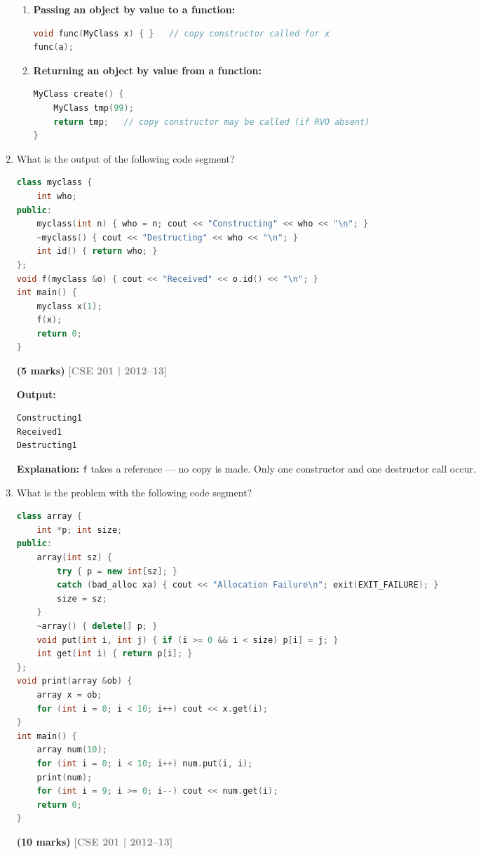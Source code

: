 \documentclass[12pt,a3paper]{article}
\newcommand{\yr}[1]{\hfill\textcolor{gray}{\small\textbf{[#1]}}}
\newcommand{\mk}[1]{\textcolor{orange!70!black}{\small\textbf{(#1 marks)}}}
\begin{document}
\begin{enumerate}
\begin{tcolorbox}
\begin{enumerate}[label=\textbf{\arabic*.}]
  \item \textbf{Passing an object by value to a function:}
\begin{lstlisting}[language=C++]
void func(MyClass x) { }   // copy constructor called for x
func(a);
\end{lstlisting}

  \item \textbf{Returning an object by value from a function:}
\begin{lstlisting}[language=C++]
MyClass create() {
    MyClass tmp(99);
    return tmp;   // copy constructor may be called (if RVO absent)
}
\end{lstlisting}
\end{enumerate}

\end{tcolorbox}


\item What is the output of the following code segment?
\begin{lstlisting}[language=C++]
class myclass {
    int who;
public:
    myclass(int n) { who = n; cout << "Constructing" << who << "\n"; }
    ~myclass() { cout << "Destructing" << who << "\n"; }
    int id() { return who; }
};
void f(myclass &o) { cout << "Received" << o.id() << "\n"; }
int main() {
    myclass x(1);
    f(x);
    return 0;
}
\end{lstlisting}
\mk{5}
\yr{CSE 201 | 2012--13}


\begin{tcolorbox}[enhanced,breakable,ansbox,colback=cE!4,colframe=cE,
  boxrule=0.8pt,arc=5pt,
  title={\textbf{Answer --- Output of myclass pass-by-reference code}},
  fonttitle=\bfseries\color{white},colbacktitle=cE]

\textbf{Output:}
\begin{lstlisting}
Constructing1
Received1
Destructing1
\end{lstlisting}

\textbf{Explanation:} \texttt{f} takes a reference --- no copy is
made.  Only one constructor and one destructor call occur.

\end{tcolorbox}

\item What is the problem with the following code segment?
\begin{lstlisting}[language=C++]
class array {
    int *p; int size;
public:
    array(int sz) {
        try { p = new int[sz]; }
        catch (bad_alloc xa) { cout << "Allocation Failure\n"; exit(EXIT_FAILURE); }
        size = sz;
    }
    ~array() { delete[] p; }
    void put(int i, int j) { if (i >= 0 && i < size) p[i] = j; }
    int get(int i) { return p[i]; }
};
void print(array &ob) {
    array x = ob;
    for (int i = 0; i < 10; i++) cout << x.get(i);
}
int main() {
    array num(10);
    for (int i = 0; i < 10; i++) num.put(i, i);
    print(num);
    for (int i = 9; i >= 0; i--) cout << num.get(i);
    return 0;
}
\end{lstlisting}
\mk{10}
\yr{CSE 201 | 2012--13}


\end{enumerate}
\end{document}
